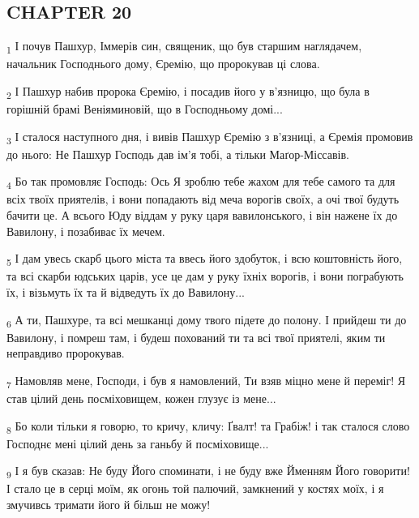 \subsection{CHAPTER 20}
\begin{tcolorbox}
\textsubscript{1} І почув Пашхур, Іммерів син, священик, що був старшим наглядачем, начальник Господнього дому, Єремію, що пророкував ці слова.
\end{tcolorbox}
\begin{tcolorbox}
\textsubscript{2} І Пашхур набив пророка Єремію, і посадив його у в'язницю, що була в горішній брамі Веніяминовій, що в Господньому домі...
\end{tcolorbox}
\begin{tcolorbox}
\textsubscript{3} І сталося наступного дня, і вивів Пашхур Єремію з в'язниці, а Єремія промовив до нього: Не Пашхур Господь дав ім'я тобі, а тільки Маґор-Міссавів.
\end{tcolorbox}
\begin{tcolorbox}
\textsubscript{4} Бо так промовляє Господь: Ось Я зроблю тебе жахом для тебе самого та для всіх твоїх приятелів, і вони попадають від меча ворогів своїх, а очі твої будуть бачити це. А всього Юду віддам у руку царя вавилонського, і він нажене їх до Вавилону, і позабиває їх мечем.
\end{tcolorbox}
\begin{tcolorbox}
\textsubscript{5} І дам увесь скарб цього міста та ввесь його здобуток, і всю коштовність його, та всі скарби юдських царів, усе це дам у руку їхніх ворогів, і вони пограбують їх, і візьмуть їх та й відведуть їх до Вавилону...
\end{tcolorbox}
\begin{tcolorbox}
\textsubscript{6} А ти, Пашхуре, та всі мешканці дому твого підете до полону. І прийдеш ти до Вавилону, і помреш там, і будеш похований ти та всі твої приятелі, яким ти неправдиво пророкував.
\end{tcolorbox}
\begin{tcolorbox}
\textsubscript{7} Намовляв мене, Господи, і був я намовлений, Ти взяв міцно мене й переміг! Я став цілий день посміховищем, кожен глузує із мене...
\end{tcolorbox}
\begin{tcolorbox}
\textsubscript{8} Бо коли тільки я говорю, то кричу, кличу: Ґвалт! та Грабіж! і так сталося слово Господнє мені цілий день за ганьбу й посміховище...
\end{tcolorbox}
\begin{tcolorbox}
\textsubscript{9} І я був сказав: Не буду Його споминати, і не буду вже Йменням Його говорити! І стало це в серці моїм, як огонь той палючий, замкнений у костях моїх, і я змучивсь тримати його й більш не можу!
\end{tcolorbox}
